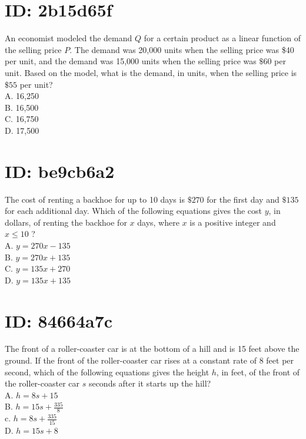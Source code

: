 \section*{ID: 2b15d65f}
An economist modeled the demand $Q$ for a certain product as a linear function of the selling price $P$. The demand was 20,000 units when the selling price was \$40 per unit, and the demand was 15,000 units when the selling price was $\$ 60$ per unit. Based on the model, what is the demand, in units, when the selling price is $\$ 55$ per unit?\\
A. 16,250\\
B. 16,500\\
C. 16,750\\
D. 17,500





\section*{ID: be9cb6a2}
The cost of renting a backhoe for up to 10 days is $\$ 270$ for the first day and $\$ 135$ for each additional day. Which of the following equations gives the cost $y$, in dollars, of renting the backhoe for $x$ days, where $x$ is a positive integer and $x \leq 10$ ?\\
A. $y=270 x-135$\\
B. $y=270 x+135$\\
C. $y=135 x+270$\\
D. $y=135 x+135$






\section*{ID: 84664a7c}
The front of a roller-coaster car is at the bottom of a hill and is 15 feet above the ground. If the front of the roller-coaster car rises at a constant rate of 8 feet per second, which of the following equations gives the height $h$, in feet, of the front of the roller-coaster car $s$ seconds after it starts up the hill?\\
A. $h=8 s+15$\\
B. $h=15 s+\frac{335}{8}$\\
c. $h=8 s+\frac{335}{15}$\\
D. $h=15 s+8$







